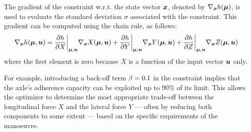 The gradient of the constraint w.r.t. the state vector $\boldsymbol{x}$, denoted by $\nabla_{\boldsymbol{x}}h(\boldsymbol{\mu})$, is used to evaluate the standard deviation $\sigma$ associated with the constraint. This gradient can be computed using the chain rule, as follows:
\begin{equation}
	\nabla_{\boldsymbol{x}}h(\boldsymbol{\mu},\boldsymbol{u}) = 
	\frac{\partial h}{\partial X}\bigg|_{\boldsymbol{\mu},\boldsymbol{u}}\nabla_{\boldsymbol{x}}X(\boldsymbol{\mu},\boldsymbol{u}) + 
	\frac{\partial h}{\partial Y}\bigg|_{\boldsymbol{\mu},\boldsymbol{u}}\nabla_{\boldsymbol{x}}Y(\boldsymbol{\mu},\boldsymbol{u}) + 
	\frac{\partial h}{\partial Z}\bigg|_{\boldsymbol{\mu},\boldsymbol{u}}\nabla_{\boldsymbol{x}}Z(\boldsymbol{\mu},\boldsymbol{u})
\end{equation}
where the first element is zero because $X$ is a function of the input vector $\boldsymbol{u}$ only. 

For example, introducing a back-off term $\beta=0.1$ in the constraint implies that the axle's adherence capacity can be exploited up to 90\% of its limit. This allows the optimizer to determine the most appropriate trade-off between the longitudinal force $X$ and the lateral force $Y$ --- often by reducing both components to some extent --- based on the specific requirements of the manoeuvre.